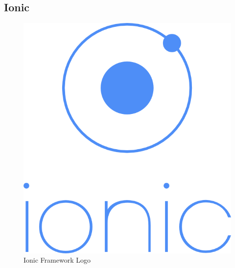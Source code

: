 \subsection{Ionic}

\begin{figure}
  \vspace{-65pt}
  \begin{center}
    \includegraphics[scale=0.35]{Figures/ionic-logo.png}
  \end{center}
  \vspace{-10pt}
  \caption{Ionic Framework Logo}
  \label{fig:IONIC}
  \vspace{5pt}
\end{figure}

